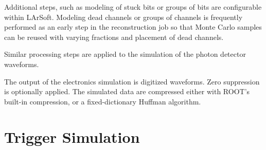 Additional steps, such as modeling of stuck bits or groups of bits are configurable within LArSoft.
Modeling dead channels or groups of channels is frequently performed as an early step
in the reconstruction job so that Monte Carlo samples can be reused with varying fractions and placement
of dead channels.

Similar processing steps are applied to the simulation of the photon detector waveforms.

The output of the electronics simulation is digitized waveforms.  Zero suppression is optionally
applied.  The simulated data are compressed either with ROOT's built-in compression, or a fixed-dictionary
Huffman algorithm.

\section{Trigger Simulation}
